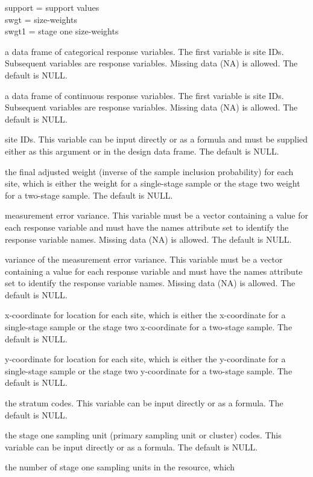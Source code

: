 \begin{Arguments}
\begin{ldescription}
support = support values\\
swgt = size-weights\\
swgt1 = stage one size-weights
\item[\code{data.cat}] a data frame of categorical response variables.  The first 
variable is site IDs.  Subsequent variables are response variables.
Missing data (NA) is allowed.  The default is NULL.
\item[\code{data.cont}] a data frame of continuous response variables.  The first 
variable is site IDs.  Subsequent variables are response variables.
Missing data (NA) is allowed.  The default is NULL.
\item[\code{siteID}] site IDs.  This variable can be input directly or as a formula 
and must be supplied either as this argument or in the design data 
frame.  The default is NULL.
\item[\code{wgt}] the final adjusted weight (inverse of the sample inclusion
probability) for each site, which is either the weight for a 
single-stage sample or the stage two weight for a two-stage sample.
The default is NULL.
\item[\code{sigma}] measurement error variance.  This variable must be a vector
containing a value for each response variable and must have the names
attribute set to identify the response variable names.  Missing data (NA)
is allowed.  The default is NULL.
\item[\code{var.sigma}] variance of the measurement error variance.  This variable
must be a vector containing a value for each response variable and must have
the names attribute set to identify the response variable names.  Missing
data (NA) is allowed.  The default is NULL.
\item[\code{xcoord}] x-coordinate for location for each site, which is either the
x-coordinate for a single-stage sample or the stage two 
x-coordinate for a two-stage sample.  The default is NULL.
\item[\code{ycoord}] y-coordinate for location for each site, which is either the
y-coordinate for a single-stage sample or the stage two 
y-coordinate for a two-stage sample.  The default is NULL.
\item[\code{stratum}] the stratum codes.  This variable can be input directly or as a 
formula.  The default is NULL.
\item[\code{cluster}] the stage one sampling unit (primary sampling unit or cluster) 
codes.  This variable can be input directly or as a formula.  The 
default is NULL.
\item[\code{N.cluster}] the number of stage one sampling units in the resource, which 

\end{ldescription}
\end{Arguments}
